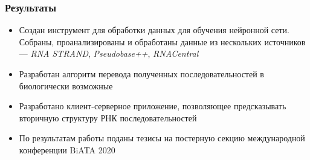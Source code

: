 \documentclass{beamer}
\begin{document}
\begin{frame}
  \transwipe[direction=90]
  \frametitle{Результаты}
  \begin{itemize}
    \item Создан инструмент для обработки данных для обучения нейронной сети. Собраны, проанализированы и обработаны данные из нескольких источников --- \textit{RNA STRAND}, \textit{Pseudobase++}, \textit{RNACentral}
    \item Разработан алгоритм перевода полученных последовательностей в биологически возможные
    \item Разработано клиент-серверное приложение, позволяющее предсказывать вторичную структуру РНК последовательностей
    \item По результатам работы поданы тезисы на постерную секцию международной конференции BiATA 2020
  \end{itemize}

\end{frame}
\end{document}
